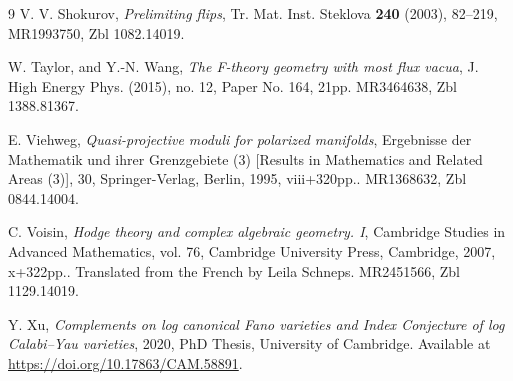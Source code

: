 \documentclass[11pt]{ip-journal}
\theoremstyle{definition}
\begin{document}
\begin{thebibliography}{9}
V. V. Shokurov, 
\emph{Prelimiting flips},
{Tr. Mat. Inst. Steklova}
\textbf{240}
(2003),
82--219,
MR1993750,
Zbl 1082.14019.

W. Taylor, 
and 
Y.-N. Wang, 
\emph{The {F}-theory geometry with most flux vacua},
{J. High Energy Phys.}
(2015),
no. 12, 
Paper No. 164, 
21pp.
MR3464638,
Zbl 1388.81367.

E. Viehweg, 
\emph{Quasi-projective moduli for polarized manifolds},
{Ergebnisse der Mathematik und ihrer Grenzgebiete (3) 
[Results in Mathematics and Related Areas (3)]},
30,
Springer-Verlag, 
Berlin,
1995,
viii+320pp..
MR1368632,
Zbl 0844.14004.

C. Voisin, 
\emph{Hodge theory and complex algebraic geometry. {I}},
Cambridge Studies in Advanced Mathematics,
vol. 76,
Cambridge University Press, Cambridge,
 2007,
x+322pp..
Translated from the French by Leila Schneps.
MR2451566,
Zbl 1129.14019.

Y. Xu, 
\emph{Complements on log canonical {F}ano varieties and {I}ndex {C}onjecture of log {C}alabi--{Y}au varieties},
2020,
PhD Thesis, 
University of Cambridge.
Available at 
\href{https://doi.org/10.17863/CAM.58891}{https://doi.org/10.17863/CAM.58891}.

\end{thebibliography}
\end{document}
